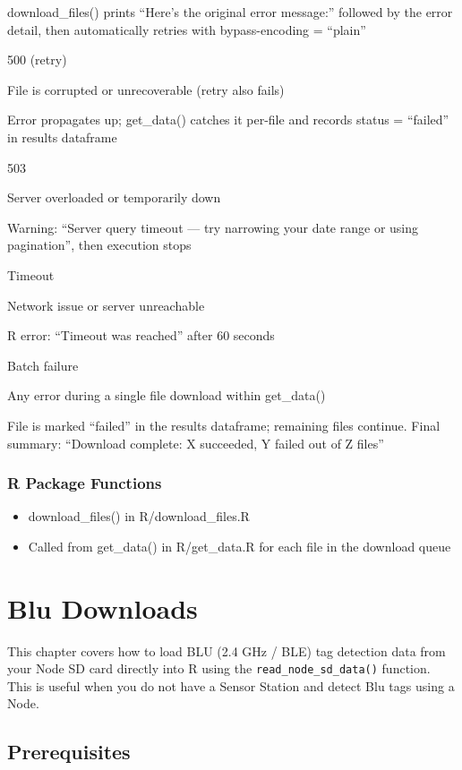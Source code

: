 \documentclass[
]{book}
\providecommand{\tightlist}{%
  \setlength{\itemsep}{0pt}\setlength{\parskip}{0pt}}
\begin{document}
download\_files() prints ``Here's the original error message:'' followed by the error detail, then automatically retries with bypass-encoding = ``plain''

{500 (retry)}

File is corrupted or unrecoverable (retry also fails)

Error propagates up; get\_data() catches it per-file and records status = ``failed'' in results dataframe

{503}

Server overloaded or temporarily down

Warning: ``Server query timeout --- try narrowing your date range or using pagination'', then execution stops

{Timeout}

Network issue or server unreachable

R error: ``Timeout was reached'' after 60 seconds

{Batch failure}

Any error during a single file download within get\_data()

File is marked ``failed'' in the results dataframe; remaining files continue. Final summary: ``Download complete: X succeeded, Y failed out of Z files''

\subsection{R Package Functions}\label{r-package-functions-3}

\begin{itemize}
\tightlist
\item
  download\_files() in R/download\_files.R
\item
  Called from get\_data() in R/get\_data.R for each file in the download queue
\end{itemize}

\chapter{Blu Downloads}\label{blu-downloads}

This chapter covers how to load BLU (2.4 GHz / BLE) tag detection data from your Node SD card directly into R using the \texttt{read\_node\_sd\_data()} function. This is useful when you do not have a Sensor Station and detect Blu tags using a Node.

\section{Prerequisites}\label{prerequisites}
\end{document}
